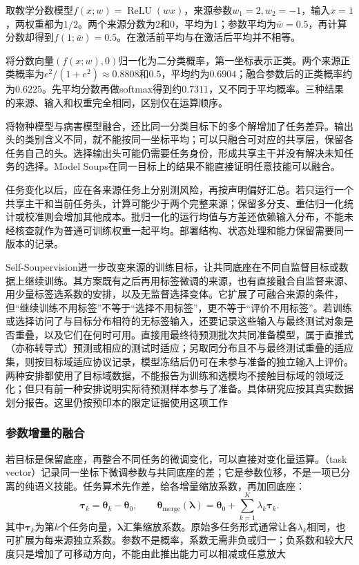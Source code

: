\begin{example}[非线性使两种平均不相等]
  \label{ex:ket-integration-nonlinear-average}
  取教学分数模型$f(x;w)=\operatorname{ReLU}(wx)$，来源参数$w_1=2,w_2=-1$，输入$x=1$，两权重都为$1/2$。两个来源分数为2和0，平均为1；参数平均为$\bar w=0.5$，再计算分数却得到$f(1;\bar w)=0.5$。在激活前平均与在激活后平均并不相等。

  将分数向量$(f(x;w),0)$归一化为二分类概率，第一坐标表示正类。两个来源正类概率为$e^2/(1+e^2)\approx0.8808$和$0.5$，平均约为$0.6904$；融合参数后的正类概率约为$0.6225$。先平均分数再做softmax得到约$0.7311$，又不同于平均概率。三种结果的来源、输入和权重完全相同，区别仅在运算顺序。
\end{example}

将物种模型与病害模型融合，还比同一分类目标下的多个解增加了任务差异。输出头的类别含义不同，就不能按同一坐标平均；可以只融合可对应的共享层，保留各任务自己的头。选择输出头可能仍需要任务身份，形成共享主干并没有解决未知任务的选择。Model Soups在同一目标上的结果不能直接证明任意技能可以融合。

任务变化以后，应在各来源任务上分别测风险，再按声明偏好汇总。若只运行一个共享主干和当前任务头，计算可能少于两个完整来源；保留多分支、重估归一化统计或校准则会增加其他成本。批归一化的运行均值与方差还依赖输入分布，不能未经核查就作为普通可训练权重一起平均。部署结构、状态处理和能力保留需要同一版本的记录。

Self-Soupervision进一步改变来源的训练目标，让共同底座在不同自监督目标或数据上继续训练。其方案既有之后再用标签微调的来源，也有直接融合自监督来源、用少量标签选系数的安排，以及无监督选择变体。它扩展了可融合来源的条件，但“继续训练不用标签”不等于“选择不用标签”，更不等于“评价不用标签”。若训练或选择访问了与目标分布相符的无标签输入，还要记录这些输入与最终测试对象是否重叠，以及它们在何时可用。直接用最终待预测批次共同准备模型，属于直推式（亦称转导式）预测或相应的测试时适应；另取同分布且不与最终测试重叠的适应集，则按目标域适应协议记录，模型冻结后仍可在未参与准备的独立输入上评价。两种安排都使用了目标域数据，不能报告为训练和选模均不接触目标域的领域泛化；但只有前一种安排说明实际待预测样本参与了准备。具体研究应按其真实数据划分报告。这里仍按预印本的限定证据使用这项工作

\subsubsection{参数增量的融合}
\label{sec:ket-integration-deltas}

若目标是保留底座，再整合不同任务的微调变化，可以直接对变化量运算。（task vector）记录同一坐标下微调参数与共同底座的差；它是参数位移，不是一项已分离的纯语义技能。任务算术先作差，给各增量缩放系数，再加回底座：
\begin{equation}
  \bm{\tau}_k=\bm{\theta}_k-\bm{\theta}_0,\qquad
  \bm{\theta}_{\mathrm{merge}}(\bm{\lambda})
    =\bm{\theta}_0+\sum_{k=1}^{K}\lambda_k\bm{\tau}_k.
  \label{eq:ket-integration-task-arithmetic}
\end{equation}
其中$\bm{\tau}_k$为第$k$个任务向量，$\bm{\lambda}$汇集缩放系数。原始多任务形式通常让各$\lambda_k$相同，也可扩展为每来源独立系数。参数不是概率，系数无需非负或归一；负系数和较大尺度只是增加了可移动方向，不能由此推出能力可以相减或任意放大

